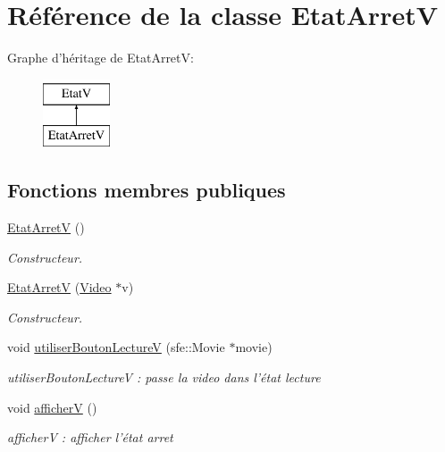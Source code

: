 \hypertarget{classEtatArretV}{\section{Référence de la classe Etat\+Arret\+V}
\label{classEtatArretV}
}
Graphe d'héritage de Etat\+Arret\+V\+:\begin{figure}[H]
\begin{center}
\leavevmode
\includegraphics[height=2.000000cm]{classEtatArretV}
\end{center}
\end{figure}
\subsection*{Fonctions membres publiques}
\begin{DoxyCompactItemize}
\item 
\hypertarget{classEtatArretV_a5acc53409e45b619e4a4787822380813}{\hyperlink{classEtatArretV_a5acc53409e45b619e4a4787822380813}{Etat\+Arret\+V} ()}\label{classEtatArretV_a5acc53409e45b619e4a4787822380813}

\begin{DoxyCompactList}\small\item\em Constructeur. \end{DoxyCompactList}\item 
\hyperlink{classEtatArretV_ab5cd0f3379bab61653f42732b446c266}{Etat\+Arret\+V} (\hyperlink{classVideo}{Video} $\ast$v)
\begin{DoxyCompactList}\small\item\em Constructeur. \end{DoxyCompactList}\item 
\hypertarget{classEtatArretV_af74e3607e8f4a966139d12929ee29f23}{void \hyperlink{classEtatArretV_af74e3607e8f4a966139d12929ee29f23}{utiliser\+Bouton\+Lecture\+V} (sfe\+::\+Movie $\ast$movie)}\label{classEtatArretV_af74e3607e8f4a966139d12929ee29f23}

\begin{DoxyCompactList}\small\item\em utiliser\+Bouton\+Lecture\+V \+: passe la video dans l'état lecture \end{DoxyCompactList}\item 
\hypertarget{classEtatArretV_a87941d7ebc9647c7c7dd0d3e8c901a35}{void \hyperlink{classEtatArretV_a87941d7ebc9647c7c7dd0d3e8c901a35}{afficher\+V} ()}\label{classEtatArretV_a87941d7ebc9647c7c7dd0d3e8c901a35}

\begin{DoxyCompactList}\small\item\em afficher\+V \+: afficher l'état arret \end{DoxyCompactList}\end{DoxyCompactItemize}


